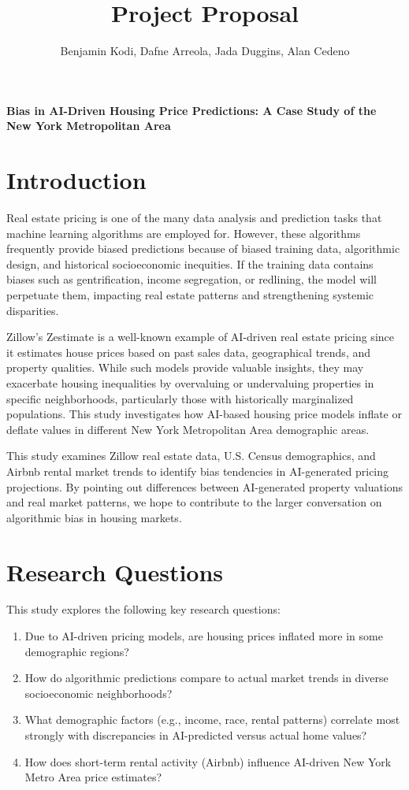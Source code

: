 \documentclass{article}
\title{\textbf{Project Proposal}}
\author{Benjamin Kodi, Dafne Arreola, Jada Duggins, Alan Cedeno}
\date{}
\begin{document}
\maketitle

\begin{center}
    \textbf{Bias in AI-Driven Housing Price Predictions: A Case Study of the New York Metropolitan Area}
\end{center}

\section{Introduction}
Real estate pricing is one of the many data analysis and prediction tasks that machine learning algorithms are employed for. However, these algorithms frequently provide biased predictions because of biased training data, algorithmic design, and historical socioeconomic inequities. If the training data contains biases such as gentrification, income segregation, or redlining, the model will perpetuate them, impacting real estate patterns and strengthening systemic disparities. 

Zillow's Zestimate is a well-known example of AI-driven real estate pricing since it estimates house prices based on past sales data, geographical trends, and property qualities. While such models provide valuable insights, they may exacerbate housing inequalities by overvaluing or undervaluing properties in specific neighborhoods, particularly those with historically marginalized populations. This study investigates how AI-based housing price models inflate or deflate values in different New York Metropolitan Area demographic areas.

This study examines Zillow real estate data, U.S. Census demographics, and Airbnb rental market trends to identify bias tendencies in AI-generated pricing projections. By pointing out differences between AI-generated property valuations and real market patterns, we hope to contribute to the larger conversation on algorithmic bias in housing markets. 

\section{Research Questions}
This study explores the following key research questions:

\begin{enumerate}
    \item Due to AI-driven pricing models, are housing prices inflated more in some demographic regions?
    \item How do algorithmic predictions compare to actual market trends in diverse socioeconomic neighborhoods?
    \item What demographic factors (e.g., income, race, rental patterns) correlate most strongly with discrepancies in AI-predicted versus actual home values?
    \item How does short-term rental activity (Airbnb) influence AI-driven New York Metro Area price estimates?
\end{enumerate}
\end{document}

